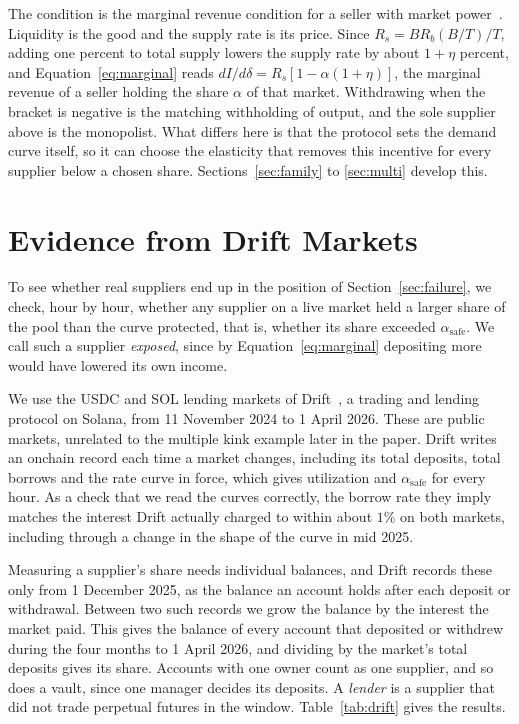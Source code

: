 \documentclass[11pt,a4paper]{article}
\begin{document}
The condition is the marginal revenue condition for a seller with market power~\cite{cournot,lerner}. Liquidity is the good and the supply rate is its price. Since $R_s=BR_b(B/T)/T$, adding one percent to total supply lowers the supply rate by about $1+\eta$ percent, and Equation~\ref{eq:marginal} reads $dI/d\delta=R_s[1-\alpha(1+\eta)]$, the marginal revenue of a seller holding the share $\alpha$ of that market. Withdrawing when the bracket is negative is the matching withholding of output, and the sole supplier above is the monopolist. What differs here is that the protocol sets the demand curve itself, so it can choose the elasticity that removes this incentive for every supplier below a chosen share. Sections~\ref{sec:family} to \ref{sec:multi} develop this.

\section{Evidence from Drift Markets}
\label{sec:evidence}

To see whether real suppliers end up in the position of Section~\ref{sec:failure}, we check, hour by hour, whether any supplier on a live market held a larger share of the pool than the curve protected, that is, whether its share exceeded $\alpha_{\mathrm{safe}}$. We call such a supplier \emph{exposed}, since by Equation~\ref{eq:marginal} depositing more would have lowered its own income.

We use the USDC and SOL lending markets of Drift~\cite{drift}, a trading and lending protocol on Solana, from 11 November 2024 to 1 April 2026. These are public markets, unrelated to the multiple kink example later in the paper. Drift writes an onchain record each time a market changes, including its total deposits, total borrows and the rate curve in force, which gives utilization and $\alpha_{\mathrm{safe}}$ for every hour. As a check that we read the curves correctly, the borrow rate they imply matches the interest Drift actually charged to within about $1\%$ on both markets, including through a change in the shape of the curve in mid 2025.

Measuring a supplier's share needs individual balances, and Drift records these only from 1 December 2025, as the balance an account holds after each deposit or withdrawal. Between two such records we grow the balance by the interest the market paid. This gives the balance of every account that deposited or withdrew during the four months to 1 April 2026, and dividing by the market's total deposits gives its share. Accounts with one owner count as one supplier, and so does a vault, since one manager decides its deposits. A \emph{lender} is a supplier that did not trade perpetual futures in the window. Table~\ref{tab:drift} gives the results.
\end{document}
